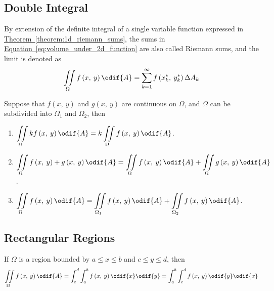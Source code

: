 \documentclass{article}
\begin{document}
\subsection{Double Integral}
\begin{definition}
    By extension of the definite integral of a single variable function
    expressed in
    \hyperref[theorem:1d_riemann_sums]{Theorem~\ref{theorem:1d_riemann_sums}},
    the sums in
    \hyperref[eq:volume_under_2d_function]{Equation~\ref{eq:volume_under_2d_function}}
    are also called Riemann sums, and the limit is denoted as
    \begin{equation*}
        \iint\limits_{\Omega} f\left( x,\: y \right)  \odif{A}
        = \sum_{k=1}^{\infty} f\left( x_k^\ast,\: y_k^\ast \right) \Delta A_k
    \end{equation*}
\end{definition}
\begin{tcolorboxlarge}[title={Properties of Double Integrals}]
    \begin{theorem}
        Suppose that \(f\left( x,\: y \right) \) and \(g\left( x,\: y \right)\) are continuous on
        \(\Omega\), and \(\Omega\) can be subdivided into \(\Omega_1\)
        and \(\Omega_2\), then
        \begin{enumerate}[label=\normalfont\alph*)] %
            \item \(\displaystyle\iint\limits_\Omega kf\left( x,\: y \right) \odif{A}
                  = k\iint\limits_\Omega f\left( x,\: y \right) \odif{A}\).
            \item \(\displaystyle\iint\limits_\Omega f\left( x,\: y \right) + g\left( x,\: y \right) \odif{A}
                  = \iint\limits_\Omega f\left( x,\: y \right) \odif{A} + \iint\limits_\Omega g\left( x,\: y \right) \odif{A}\).
            \item \(\displaystyle\iint\limits_\Omega f\left( x,\: y \right) \odif{A}
                  = \iint\limits_{\Omega_1} f\left( x,\: y \right) \odif{A} + \iint\limits_{\Omega_2} f\left( x,\: y \right) \odif{A}\).
        \end{enumerate}
    \end{theorem}
\end{tcolorboxlarge}
\subsection{Rectangular Regions}
If \(\Omega\) is a region bounded by \(a \leq x \leq b\) and \(c \leq y
\leq d\), then
\begin{equation*}
    \iint\limits_{\Omega} f\left( x,\: y \right) \odif{A} = \int_c^d\int_a^b f\left( x,\: y \right) \odif{x} \odif{y} = \int_a^b\int_c^d f\left( x,\: y \right) \odif{y} \odif{x}
\end{equation*}
\end{document}
